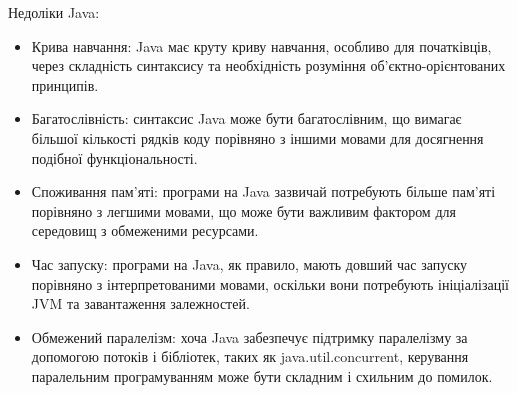 Недоліки Java:
\begin{itemize}
    \item Крива навчання: Java має круту криву навчання, особливо для початківців, через складність синтаксису та необхідність розуміння об'єктно-орієнтованих принципів.
    \item Багатослівність: синтаксис Java може бути багатослівним, що вимагає більшої кількості рядків коду порівняно з іншими мовами для досягнення подібної функціональності.
    \item Споживання пам'яті: програми на Java зазвичай потребують більше пам'яті порівняно з легшими мовами, що може бути важливим фактором для середовищ з обмеженими ресурсами.
    \item Час запуску: програми на Java, як правило, мають довший час запуску порівняно з інтерпретованими мовами, оскільки вони потребують ініціалізації JVM та завантаження залежностей.
    \item Обмежений паралелізм: хоча Java забезпечує підтримку паралелізму за допомогою потоків і бібліотек, таких як java.util.concurrent, керування паралельним програмуванням може бути складним і схильним до помилок.
\end{itemize}